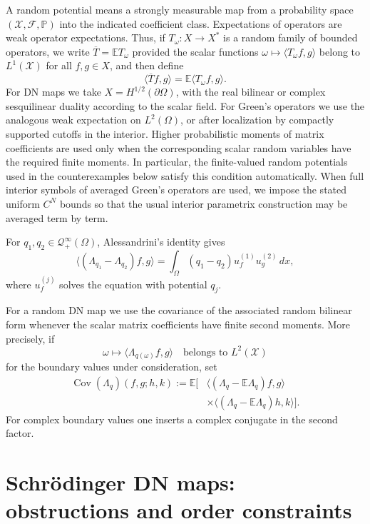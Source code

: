 \documentclass[11pt]{article}
\newcommand{\OmegaD}{\Omega}
\newcommand{\E}{\mathbb E}
\newcommand{\Prob}{\mathbb P}
\newcommand{\Cov}{\operatorname{Cov}}
\newcommand{\la}{\langle}
\newcommand{\ra}{\rangle}
\theoremstyle{plain}
\theoremstyle{definition}
\theoremstyle{remark}
\begin{document}
A random potential means a strongly measurable map from a probability space $(\mathcal X,\mathcal F,\Prob)$ into the indicated coefficient class.  Expectations of operators are weak operator expectations.  Thus, if $T_\omega:X\to X^*$ is a random family of bounded operators, we write $\overline T=\E T_\omega$ provided the scalar functions $\omega\mapsto\la T_\omega f,g\ra$ belong to $L^1(\mathcal X)$ for all $f,g\in X$, and then define
\[
  \la \overline T f,g\ra=\E\la T_\omega f,g\ra .
\]
For DN maps we take $X=H^{1/2}(\partial\OmegaD)$, with the real bilinear or complex sesquilinear duality according to the scalar field.  For Green's operators we use the analogous weak expectation on $L^2(\OmegaD)$, or after localization by compactly supported cutoffs in the interior.  Higher probabilistic moments of matrix coefficients are used only when the corresponding scalar random variables have the required finite moments.  In particular, the finite-valued random potentials used in the counterexamples below satisfy this condition automatically.  When full interior symbols of averaged Green's operators are used, we impose the stated uniform $C^N$ bounds so that the usual interior parametrix construction may be averaged term by term.

For $q_1,q_2\in \mathcal Q_+^\infty(\OmegaD)$, Alessandrini's identity gives
\begin{equation}\label{eq:Alessandrini-q}
  \la(\Lambda_{q_1}-\Lambda_{q_2})f,g\ra
  =\int_\OmegaD (q_1-q_2)u_f^{(1)}u_g^{(2)}\,dx,
\end{equation}
where $u_f^{(j)}$ solves the equation with potential $q_j$.

For a random DN map we use the covariance of the associated random bilinear form whenever the scalar matrix coefficients have finite second moments.  More precisely, if
\[
  \omega\mapsto \la \Lambda_{q(\omega)}f,g\ra
  \quad\text{belongs to }L^2(\mathcal X)
\]
for the boundary values under consideration, set
\begin{equation}\label{eq:DN-covariance-definition}
\begin{split}
  \Cov(\Lambda_q)(f,g;h,k)
  :=\E\Big[&\la(\Lambda_q-\E\Lambda_q)f,g\ra \\
  &\times \la(\Lambda_q-\E\Lambda_q)h,k\ra\Big].
\end{split}
\end{equation}
For complex boundary values one inserts a complex conjugate in the second factor.

\section{Schr\"odinger DN maps: obstructions and order constraints}
\label{sec:schrodinger-DN-obstructions}
\end{document}

